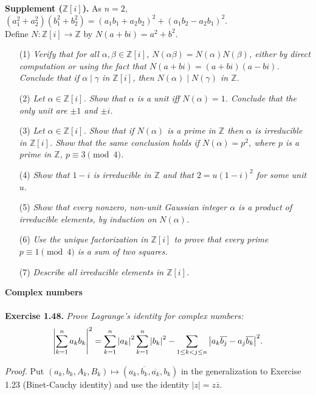 \documentclass{article}
\begin{document}
\textbf{Supplement ($\mathbb{Z}[i]$).}
As $n = 2$,
$(a_1^2 + a_2^2)(b_1^2 + b_2^2)
= (a_1 b_1 + a_2 b_2)^2 + (a_1 b_2 - a_2 b_1)^2$. \\

Define $N: \mathbb{Z}[i] \rightarrow \mathbb{Z}$ by
$N(a+bi) = a^2 + b^2$.

\begin{enumerate}
\item[(1)]
\emph{Verify that for all $\alpha, \beta \in \mathbb{Z}[i]$,
$N(\alpha\beta) = N(\alpha)N(\beta)$,
either by direct computation or using the fact that
$N(a+bi) = (a+bi)(a-bi)$.
Conclude that if $\alpha \mid \gamma$ in $\mathbb{Z}[i]$,
then $N(\alpha) \mid N(\gamma)$ in $\mathbb{Z}$.}
\item[(2)]
\emph{Let $\alpha \in \mathbb{Z}[i]$.
Show that $\alpha$ is a unit iff $N(\alpha) = 1$.
Conclude that the only unit are $\pm 1$ and $\pm i$.}
\item[(3)]
\emph{Let $\alpha \in \mathbb{Z}[i]$.
Show that if $N(\alpha)$ is a prime in $\mathbb{Z}$ then
$\alpha$ is irreducible in $\mathbb{Z}[i]$.
Show that the same conclusion holds
if $N(\alpha) = p^2$, where $p$ is a prime in $\mathbb{Z}$,
$p \equiv 3 \pmod{4}$.}
\item[(4)]
\emph{Show that $1-i$ is irreducible in $\mathbb{Z}$
and that $2 = u(1-i)^2$ for some unit $u$.}
\item[(5)]
\emph{Show that every nonzero, non-unit Gaussian integer $\alpha$
is a product of irreducible elements, by induction on $N(\alpha)$.}
\item[(6)]
\emph{Use the unique factorization in $\mathbb{Z}[i]$ to prove that
every prime $p \equiv 1 \pmod{4}$ is a sum of two squares.}
\item[(7)]
\emph{Describe all irreducible elements in $\mathbb{Z}[i]$.}
\end{enumerate}






\textbf{\large Complex numbers} \\\\



\textbf{Exercise 1.48.}
\emph{Prove Lagrange's identity for complex numbers:
$$\abs{ \sum_{k=1}^{n} a_k b_k }^2
= \sum_{k=1}^{n} \abs{a_k}^2 \sum_{k=1}^{n} \abs{b_k}^2
- \sum_{1 \leq k < j \leq n}
\abs{ a_k \overline{b_j} - a_j \overline{b_k} }^2.$$}

\emph{Proof.}
Put $(a_k, b_k, A_k, B_k) \mapsto (a_k, \overline{b_k}, \overline{a_k}, b_k)$
in the generalization to Exercise 1.23 (Binet-Cauchy identity) and use
the identity $|z| = z \overline{z}$.
\end{document}
